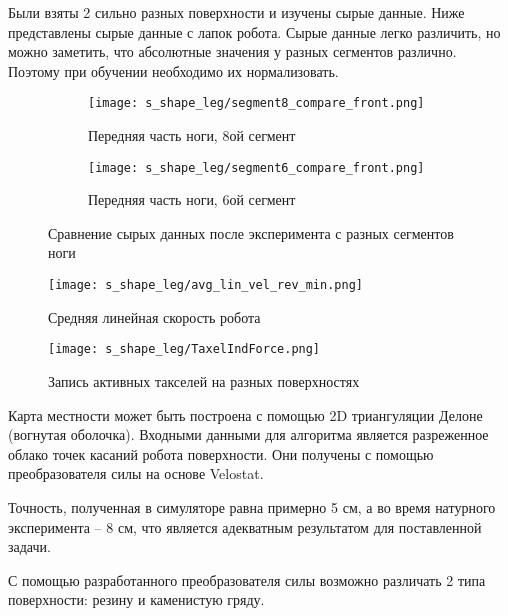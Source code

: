 Были взяты 2 сильно разных поверхности и изучены сырые данные. Ниже  представлены сырые данные с лапок робота. Сырые данные легко различить, но можно заметить, что абсолютные значения у разных сегментов различно. Поэтому при обучении необходимо их нормализовать.

\begin{figure}[H]
    \begin{subfigure}[t]{0.9\textwidth}
        \centering\texttt{[image: s\_shape\_leg/segment8\_compare\_front.png]}
        \caption{Передняя часть ноги, 8ой сегмент}
    \end{subfigure}

    \begin{subfigure}[t]{0.9\textwidth}
        \centering\texttt{[image: s\_shape\_leg/segment6\_compare\_front.png]}
        \caption{Передняя часть ноги, 6ой сегмент}
    \end{subfigure}
    \caption{Сравнение сырых данных после эксперимента с разных сегментов ноги}
    \label{fig:data_from_legs}
\end{figure}

\begin{figure}[H]
    \centering\texttt{[image: s\_shape\_leg/avg\_lin\_vel\_rev\_min.png]}
    \caption{Средняя линейная скорость робота}
    \label{fig:s_shape_leg/AverageVelocity (1).png}
\end{figure}

\begin{figure}[H]
    \centering\texttt{[image: s\_shape\_leg/TaxelIndForce.png]}
    \caption{Запись активных такселей на разных поверхностях}
    \label{fig:s_shape_leg/TaxelIndForce_full.png}
\end{figure}

Карта местности может быть построена с помощью 2D триангуляции Делоне (вогнутая оболочка). Входными данными для алгоритма является разреженное облако точек касаний робота поверхности. Они получены с помощью преобразователя силы на основе Velostat.

Точность, полученная в симуляторе равна примерно 5 см, а во время натурного эксперимента -- 8 см, что является адекватным результатом для поставленной задачи.

С помощью разработанного преобразователя силы возможно различать 2 типа поверхности: резину и каменистую гряду.